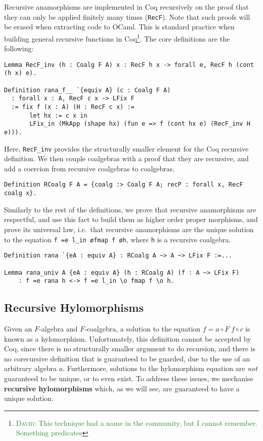 \documentclass[a4paper, UKenglish, cleveref, autoref, thm-restate]{lipics-v2021}
\newcommand{\dcas}[1]{\textcolor{ForestGreen}{\textsc{David}: #1}}
\begin{document}
Recursive anamorphisms are implemented in Coq recursively on the proof that
they can only be applied finitely many times (\texttt{RecF}).  Note
that such proofs will be erased when extracting code to OCaml. This is standard
practice when building general recursive functions in Coq\footnote{\dcas{This
technique had a name in the community, but I cannot remember. Something
predicates}}. The core definitions are the following:
\begin{verbatim}
Lemma RecF_inv (h : Coalg F A) x : RecF h x -> forall e, RecF h (cont (h x) e).

Definition rana_f__ `{equiv A} (c : Coalg F A)
  : forall x : A, RecF c x -> LFix F
  := fix f (x : A) (H : RecF c x) :=
       let hx := c x in
       LFix_in (MkApp (shape hx) (fun e => f (cont hx e) (RecF_inv H e))).
\end{verbatim}
Here, \texttt{RecF_inv} provides the structurally smaller element for
the Coq recursive definition. We then couple coalgebras with a proof that they
are recursive, and add a coercion from recursive coalgebras to coalgebras.
\begin{verbatim}
Definition RCoalg F A = {coalg :> Coalg F A; recP : forall x, RecF coalg x}.
\end{verbatim}
Similarly to the rest of the definitions, we prove that recursive anamorphisms
are respectful, and use this fact to build them as higher order proper
morphisms, and prove its universal law, i.e.\ that recursive anamorphisms are
the unique solution to the equation 
\texttt{f =e l_in \o fmap f \o h},
where \texttt{h} is a recursive coalgebra.
\begin{verbatim}
Definition rana `{eA : equiv A} : RCoalg A ~> A ~> LFix F :=...

Lemma rana_univ A {eA : equiv A} (h : RCoalg A) (f : A ~> LFix F)
    : f =e rana h <-> f =e l_in \o fmap f \o h.
\end{verbatim}

\subsection{Recursive Hylomorphisms}

Given an $F$-algebra and $F$-coalgebra, a solution to the equation $f = a \circ
F\; f \circ c$ is known as a hylomorphism. Unfortunately, this definition
cannot be accepted by Coq, since there is no structurally smaller argument to
do recursion, and there is no corecursive definition that is guaranteed to be
guarded, due to the use of an arbitrary algebra $a$. Furthermore, solutions to
the hylomorphism equation are \emph{not} guaranteed to be unique, or to even
exist. To address these issues, we mechanise \textbf{recursive hylomorphisms}
which, as we will see, are guaranteed to have a unique solution.
\end{document}
